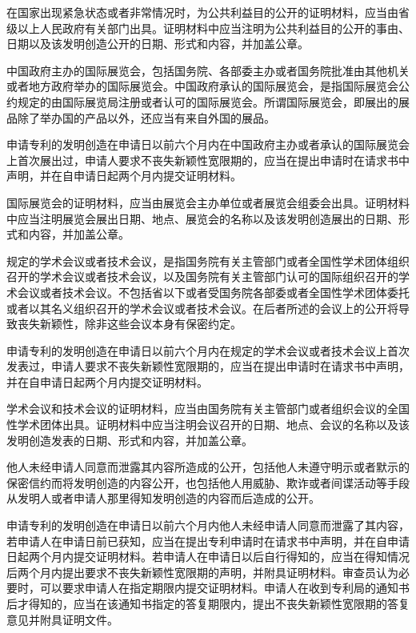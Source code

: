 在国家出现紧急状态或者非常情况时，为公共利益目的公开的证明材料，应当由省级以上人民政府有关部门出具。证明材料中应当注明为公共利益目的公开的事由、日期以及该发明创造公开的日期、形式和内容，并加盖公章。

中国政府主办的国际展览会，包括国务院、各部委主办或者国务院批准由其他机关或者地方政府举办的国际展览会。中国政府承认的国际展览会，是指国际展览会公约规定的由国际展览局注册或者认可的国际展览会。所谓国际展览会，即展出的展品除了举办国的产品以外，还应当有来自外国的展品。

申请专利的发明创造在申请日以前六个月内在中国政府主办或者承认的国际展览会上首次展出过，申请人要求不丧失新颖性宽限期的，应当在提出申请时在请求书中声明，并在自申请日起两个月内提交证明材料。

国际展览会的证明材料，应当由展览会主办单位或者展览会组委会出具。证明材料中应当注明展览会展出日期、地点、展览会的名称以及该发明创造展出的日期、形式和内容，并加盖公章。

规定的学术会议或者技术会议，是指国务院有关主管部门或者全国性学术团体组织召开的学术会议或者技术会议，以及国务院有关主管部门认可的国际组织召开的学术会议或者技术会议。不包括省以下或者受国务院各部委或者全国性学术团体委托或者以其名义组织召开的学术会议或者技术会议。在后者所述的会议上的公开将导致丧失新颖性，除非这些会议本身有保密约定。

申请专利的发明创造在申请日以前六个月内在规定的学术会议或者技术会议上首次发表过，申请人要求不丧失新颖性宽限期的，应当在提出申请时在请求书中声明，并在自申请日起两个月内提交证明材料。

学术会议和技术会议的证明材料，应当由国务院有关主管部门或者组织会议的全国性学术团体出具。证明材料中应当注明会议召开的日期、地点、会议的名称以及该发明创造发表的日期、形式和内容，并加盖公章。

他人未经申请人同意而泄露其内容所造成的公开，包括他人未遵守明示或者默示的保密信约而将发明创造的内容公开，也包括他人用威胁、欺诈或者间谍活动等手段从发明人或者申请人那里得知发明创造的内容而后造成的公开。

申请专利的发明创造在申请日以前六个月内他人未经申请人同意而泄露了其内容，若申请人在申请日前已获知，应当在提出专利申请时在请求书中声明，并在自申请日起两个月内提交证明材料。若申请人在申请日以后自行得知的，应当在得知情况后两个月内提出要求不丧失新颖性宽限期的声明，并附具证明材料。审查员认为必要时，可以要求申请人在指定期限内提交证明材料。申请人在收到专利局的通知书后才得知的，应当在该通知书指定的答复期限内，提出不丧失新颖性宽限期的答复意见并附具证明文件。

